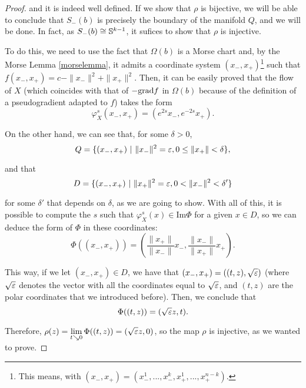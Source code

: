 \begin{proof}
and it is indeed well defined. If we show that $\rho$ is bijective, we will be able to conclude that $S_-(b)$ is precisely the boundary of the manifold $Q$, and we will be done. In fact, as $S_-(b) \cong \mathbb{S}^{k-1}$, it sufices to show that $\rho$ is injective.

To do this, we need to use the fact that $\Omega(b)$ is a Morse chart and, by the Morse Lemma \ref{morselemma}, it admits a coordinate system $(x_-,x_+)$\footnote{This means, with $(x_-,x_+)=(x_-^1,...,x_-^k,x_+^1,...,x_+^{n-k})$.} such that $f(x_-,x_+) = c - \|x_-\|^2 + \|x_+\|^2$. Then, it can be easily proved that the flow of $X$ (which coincides with that of $-\mathrm{grad} f$ in $\Omega(b)$ because of the definition of a pseudogradient adapted to $f$) takes the form
\[\varphi_X^s(x_-,x_+) = (e^{2s}x_-,e^{-2s}x_+) .\]

On the other hand, we can see that, for some $\delta > 0$,
\[Q = \{(x_-,x_+) \ | \ \|x_-\|^2 = \varepsilon, 0 \leq \|x_+\| < \delta\}, \]

and that
\[D = \{(x_-,x_+) \ | \ \|x_+\|^2 = \varepsilon, 0 < \|x_-\|^2 < \delta' \}\]

for some $\delta'$ that depends on $\delta$, as we are going to show. With all of this, it is possible to compute the $s$ such that $\varphi_X^s(x) \in \text{Im}\Phi$ for a given $x \in D$, so we can deduce the form of $\Phi$ in these coordinates:
\[\Phi((x_-,x_+)) = \left(\frac{\|x_+\|}{\|x_-\|} x_-, \frac{\|x_-\|}{\|x_+\|} x_+\right) .\]

This way, if we let $(x_-,x_+) \in D$, we have that $(x_-,x_+) = ((t,z), \sqrt{\varepsilon})$ (where $\sqrt{\varepsilon}$ denotes the vector with all the coordinates equal to $\sqrt{\varepsilon}$, and $(t,z)$ are the polar coordinates that we introduced before). Then, we conclude that
\[\Phi((t,z)) = (\sqrt{\varepsilon} z, t) .\]

Therefore, $\rho(z) = \displaystyle\lim_{t \searrow 0} \Phi((t,z)) = (\sqrt{\varepsilon} z, 0)$, so the map $\rho$ is injective, as we wanted to prove.
\end{proof}
